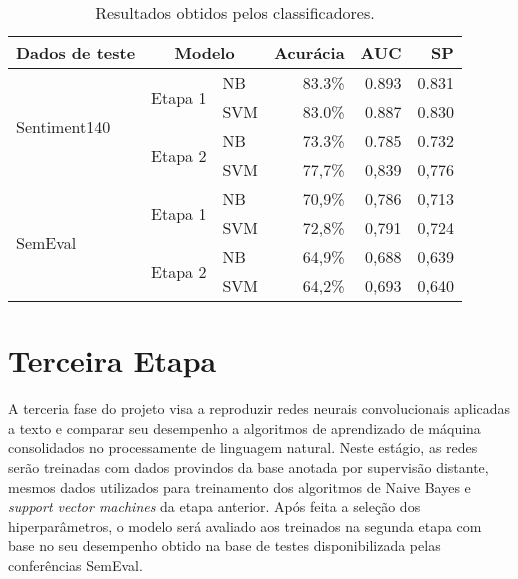 \begin{table}[h]
    \begin{center}
        \begin{tabular}{ |l|l|l|r|r|r| }
            \hline
            \textbf{Dados de teste} & \multicolumn{2}{|c|}{\textbf{Modelo}}  & \textbf{Acurácia} & \textbf{AUC} & \textbf{SP} \\ \hline
            \multirow{4}{*}{Sentiment140} & \multirow{2}{*}{Etapa 1} & NB  & 83.3\% & 0.893 & 0.831 \\ \cline{3-6}
                                          &                          & SVM & 83.0\% & 0.887 & 0.830 \\ \cline{2-6}
                                          & \multirow{2}{*}{Etapa 2} & NB  & 73.3\% & 0.785 & 0.732 \\ \cline{3-6}
                                          &                          & SVM & 77,7\% & 0,839 & 0,776 \\ \hline
            \multirow{4}{*}{SemEval}      & \multirow{2}{*}{Etapa 1} & NB  & 70,9\% & 0,786 & 0,713 \\ \cline{3-6}
                                          &                          & SVM & 72,8\% & 0,791 & 0,724 \\ \cline{2-6}
                                          & \multirow{2}{*}{Etapa 2} & NB  & 64,9\% & 0,688 & 0,639 \\ \cline{3-6}
                                          &                          & SVM & 64,2\% & 0,693 & 0,640 \\ \hline
        \end{tabular}
        \caption{Resultados obtidos pelos classificadores.}
        \label{tab:linear_perf}
    \end{center}
\end{table}

\section{Terceira Etapa}

A terceria fase do projeto visa a reproduzir redes neurais convolucionais aplicadas a texto e comparar seu desempenho
a algoritmos de aprendizado de máquina consolidados no processamente de linguagem natural.
Neste estágio, as redes serão treinadas com dados provindos da base anotada por supervisão distante, mesmos dados
utilizados para treinamento dos algoritmos de Naive Bayes e \textit{support vector machines} da etapa anterior.
Após feita a seleção dos hiperparâmetros, o modelo será avaliado aos treinados na segunda etapa com base no seu
desempenho obtido na base de testes disponibilizada pelas conferências SemEval.

